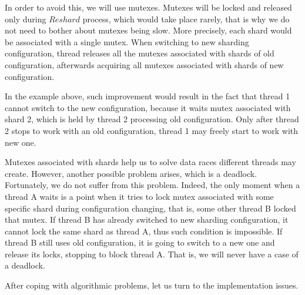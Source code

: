 \documentclass{article}
\begin{document}
In order to avoid this, we will use mutexes. Mutexes will be locked and released only during $Reshard$ process, which would take place rarely, that is why we do not need to bother about mutexes being slow. More precisely, each shard would be associated with a single mutex. When switching to new sharding configuration, thread releases all the mutexes associated with shards of old configuration, afterwards acquiring all mutexes associated with shards of new configuration.

In the example above, such improvement would result in the fact that thread 1 cannot switch to the new configuration, because it waits mutex associated with shard 2, which is held by thread 2 processing old configuration. Only after thread 2 stops to work with an old configuration, thread 1 may freely start to work with new one.

Mutexes associated with shards help us to solve data races different threads may create. However, another possible problem arises, which is a deadlock. Fortunately, we do not suffer from this problem. Indeed, the only moment when a thread A waits is a point when it tries to lock mutex associated with some specific shard during configuration changing, that is, some other thread B locked that mutex. If thread B has already switched to new sharding configuration, it cannot lock the same shard as thread A, thus such condition is impossible. If thread B still uses old configuration, it is going to switch to a new one and release its locks, stopping to block thread A. That is, we will never have a case of a deadlock.

After coping with algorithmic problems, let us turn to the implementation issues.
\end{document}
